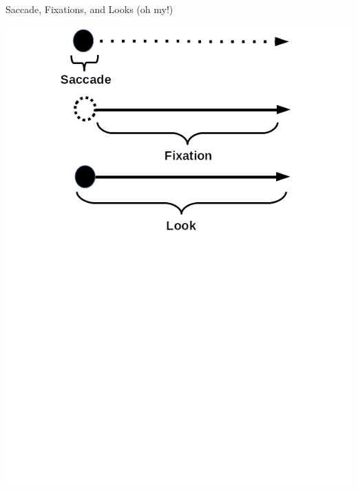 \documentclass{beamer}
\begin{document}
\begin{frame}{Saccade, Fixations, and Looks (oh my!)}
\vspace{10mm}
\begin{center}
\includegraphics[scale=0.45]{img/saccade_def2.png}
\end{center}
\end{frame}


%
\end{document}
